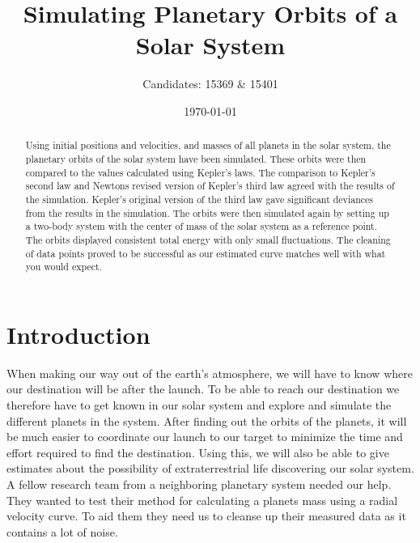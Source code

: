 \documentclass[reprint,english,notitlepage]{revtex4-2}
\begin{document}
\title{Simulating Planetary Orbits of a Solar System}
\author{Candidates: 15369 \& 15401}
\date{\today}

\begin{abstract}
	Using initial positions and velocities, and masses of all planets in the solar system, the planetary orbits of the solar system have been simulated.
	These orbits were then compared to the values calculated using Kepler's laws.
	The comparison to Kepler's second law and Newtons revised version of Kepler's third law agreed with the results of the simulation.
	Kepler's original version of the third law gave significant deviances from the results in the simulation.
	The orbits were then simulated again by setting up a two-body system with the center of mass of the solar system as a reference point.
	The orbits displayed consistent total energy with only small fluctuations.
	The cleaning of data points proved to be successful as our estimated curve matches well with what you would expect.
\end{abstract}
\maketitle

\section{Introduction}
When making our way out of the earth's atmosphere, we will have to know where our destination will be after the launch.
To be able to reach our destination we therefore have to get known in our solar system and explore and simulate the different planets in the system.
After finding out the orbits of the planets, it will be much easier to coordinate our launch to our target to minimize the time and effort required to find the destination.
Using this, we will also be able to give estimates about the possibility of extraterrestrial life discovering our solar system. A fellow research team from a neighboring planetary system needed our help. They wanted to test their method for calculating a planets mass using a radial velocity curve. To aid them they need us to cleanse up their measured data as it contains a lot of noise. 
\end{document}
